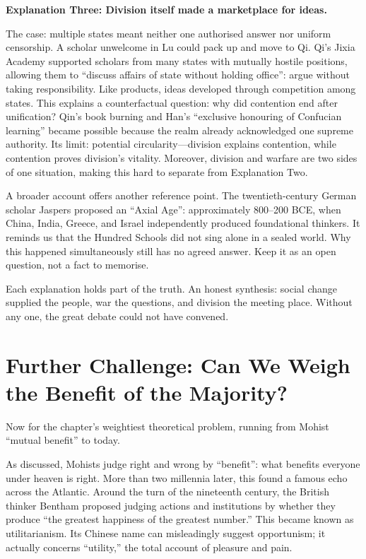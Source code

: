 \textbf{Explanation Three: Division itself made a marketplace for ideas.}

The case: multiple states meant neither one authorised answer nor uniform censorship. A scholar unwelcome in Lu could pack up and move to Qi. Qi's Jixia Academy supported scholars from many states with mutually hostile positions, allowing them to ``discuss affairs of state without holding office'': argue without taking responsibility. Like products, ideas developed through competition among states. This explains a counterfactual question: why did contention end after unification? Qin's book burning and Han's ``exclusive honouring of Confucian learning'' became possible because the realm already acknowledged one supreme authority. Its limit: potential circularity---division explains contention, while contention proves division's vitality. Moreover, division and warfare are two sides of one situation, making this hard to separate from Explanation Two.

A broader account offers another reference point. The twentieth-century German scholar Jaspers proposed an ``Axial Age'': approximately 800--200 BCE, when China, India, Greece, and Israel independently produced foundational thinkers. It reminds us that the Hundred Schools did not sing alone in a sealed world. Why this happened simultaneously still has no agreed answer. Keep it as an open question, not a fact to memorise.

Each explanation holds part of the truth. An honest synthesis: social change supplied the people, war the questions, and division the meeting place. Without any one, the great debate could not have convened.

\section[Further Challenge: Weighing Benefit]{Further Challenge: Can We Weigh the Benefit of the Majority?}
Now for the chapter's weightiest theoretical problem, running from Mohist ``mutual benefit'' to today.

As discussed, Mohists judge right and wrong by ``benefit'': what benefits everyone under heaven is right. More than two millennia later, this found a famous echo across the Atlantic. Around the turn of the nineteenth century, the British thinker Bentham proposed judging actions and institutions by whether they produce ``the greatest happiness of the greatest number.'' This became known as utilitarianism. Its Chinese name can misleadingly suggest opportunism; it actually concerns ``utility,'' the total account of pleasure and pain.

